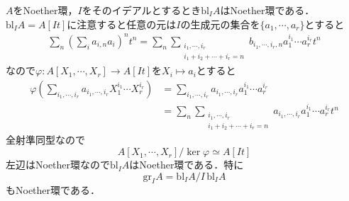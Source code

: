 
$A$をNoether環，$I$をそのイデアルとするとき$\text{bl}_{I}A$はNoether環である．\\
$\text{bl}_{I}A = A[It]$に注意すると任意の元は$I$の生成元の集合を$\{a_{1},\cdots,a_{r}\}$とすると
\begin{align*}
  \sum_{n} \left(\sum_{i}a_{i,n}a_{i}\right)^{n}t^{n}= \sum_{n}\sum_{\substack{i_{1},\cdots,i_{r}\\ i_{1}+i_{2} +\cdots + i_{r} = n}}b_{i_{1},\cdots ,i_{r},n}a_{1}^{i_{1}}\cdots a_{r}^{i_{r}}t^{n}
\end{align*}
なので$\varphi:A[X_{1},\cdots,X_{r}] \to A[It]$を$X_{i} \mapsto a_{i}$とすると
\begin{align*}
  \varphi(\sum_{i_{1},\cdots,i_{r}}a_{i_{1},\cdots ,i_{r}}X_{1}^{i_{1}}\cdots X_{r}^{i_{r}}) 
  &= \sum_{i_{1},\cdots,i_{r}}a_{i_{1},\cdots,i_{r}}a_{1}^{i_{1}}\cdots a_{r}^{i_{r}}\\
  &= \sum_{n}\sum_{\substack{i_{1},\cdots,i_{r}\\ i_{1}+i_{2}+\cdots + i_{r} = n}}a_{i_{1},\cdots,i_{r}}a_{1}^{i_{1}}\cdots a_{r}^{i_{r}}t^{n}
\end{align*}
全射準同型なので
\begin{equation*}
  A[X_{1},\cdots,X_{r}]/\ker{\varphi} \simeq A[It]
\end{equation*}
左辺はNoether環なので$\text{bl}_{I}A$はNoether環である．特に
\begin{equation*}
  \text{gr}_{I}A = \text{bl}_{I}A/I\, \text{bl}_{I}A 
\end{equation*}
もNoether環である．